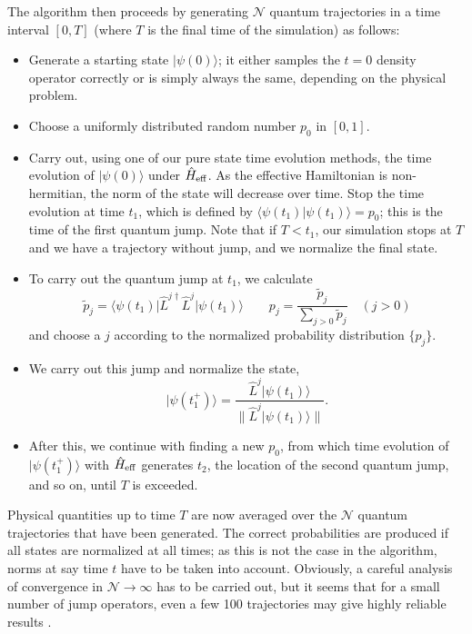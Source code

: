 \documentclass[a4paper,10pt,oneside,onecolumn,1p,times]{elsarticle}
\newcommand{\bra}[1]{\mbox{$\langle #1  |$}}
\newcommand{\ket}[1]{\mbox{$| #1  \rangle$}}
\newcommand{\braket}[2]{\mbox{$\langle #1  | #2 \rangle$}} 	%
\begin{document}
The algorithm then proceeds by generating ${\mathcal N}$ quantum trajectories in a time interval $[0,T]$ (where $T$ is the final time of the simulation) as follows: 
\begin{itemize}
\item Generate a starting state $\ket{\psi(0)}$; it either samples the $t=0$ density operator correctly or is simply always the same, depending on the physical problem.
\item Choose a uniformly distributed random number $p_0$ in $[0,1]$.
\item Carry out, using one of our pure state time evolution methods, the time evolution of $\ket{\psi(0)}$ under $\hat{H}_{{\rm eff}}$. As the effective Hamiltonian is non-hermitian, the norm of the state will decrease over time. Stop the time evolution at time $t_1$, which is defined by 
$\braket{\psi(t_1)}{\psi(t_1)} = p_0$; this is the time of the first quantum jump. Note that if $T<t_1$, our simulation stops at $T$ and we have a trajectory without jump, and we normalize the final state.
\item To carry out the quantum jump at $t_1$, we calculate
\begin{equation}
\tilde{p}_j = \bra{\psi(t_1)} \hat{L}^{j\dagger} \hat{L}^j \ket{\psi(t_1)} \quad\quad p_j = \frac{\tilde{p}_j}{\sum_{j>0} \tilde{p}_j} \quad (j>0)
\end{equation}
and choose a $j$ according to the normalized probability distribution $\{ p_j \}$.
\item We carry out this jump and normalize the state,
\begin{equation}
\ket{\psi(t_1^+)} = \frac{\hat{L}^j \ket{\psi(t_1)}}{\| \hat{L}^j \ket{\psi(t_1)} \|} .
\end{equation}
\item After this, we continue with finding a new $p_0$, from which time evolution of $\ket{\psi(t_1^+)}$ with $\hat{H}_{{\rm eff}}$ generates $t_2$, the location of the second quantum jump, and so on, until $T$ is exceeded.
\end{itemize}
Physical quantities up to time $T$ are now averaged over the ${\mathcal N}$ quantum trajectories that have been generated. The correct probabilities are produced if all states are normalized at all times; as this is not the case in the algorithm, norms at say time $t$ have to be taken into account. Obviously, a careful analysis of convergence in ${\mathcal N} \rightarrow \infty$ has to be carried out, but it seems that for a small number of jump operators, even a few 100 trajectories may give highly reliable results \cite{Daley09}.
\end{document}
